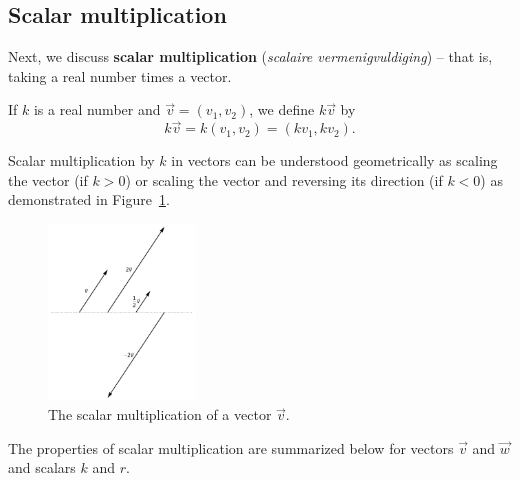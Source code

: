 \subsection{Scalar multiplication}

Next, we discuss \textbf{scalar multiplication} (\textit{scalaire vermenigvuldiging}) -- that is, taking a real number times a vector.  


\begin{definition} \label{scalarmultvector}    If $k$ is a real number and $\vec{v} = \left(v_1,v_2\right)$, we define $k\vec{v}$ by 
\[k\vec{v} = k\left(v_1,v_2\right) =\left(k v_1,k v_2\right). \]

\end{definition}

Scalar multiplication by $k$ in vectors can be understood geometrically as scaling the vector (if $k > 0$) or scaling the vector and reversing its direction (if $k < 0$) as demonstrated in Figure~\ref{fig_vector_7}.

\begin{figure}
	\begin{center}
			\includegraphics[width=0.35\textwidth]{fig_vector_7}
	\caption{The scalar multiplication of a vector $\vec{v}$. }
	\label{fig_vector_7}
	\end{center}
\end{figure}

 The properties of scalar multiplication are summarized below for vectors $\vec{v}$ and $\vec{w}$ and scalars  $k$ and $r$.



